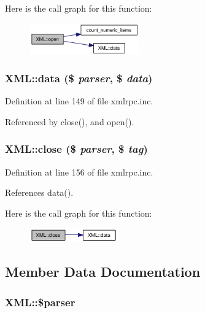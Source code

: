 Here is the call graph for this function:\nopagebreak
\begin{figure}[H]
\begin{center}
\leavevmode
\includegraphics[width=134pt]{classXML_eac7eae74d866d4f5a0cdb9be27ff279_cgraph}
\end{center}
\end{figure}
\hypertarget{classXML_ca70dfbd3e8ce956075181701b09b033}{
\subsubsection{\setlength{\rightskip}{0pt plus 5cm}XML::data (\$ {\em parser}, \$ {\em data})}}
\label{classXML_ca70dfbd3e8ce956075181701b09b033}




Definition at line 149 of file xmlrpc.inc.

Referenced by close(), and open().\hypertarget{classXML_60144a2134fc1b7f5b4b1b6a7c56bf04}{
\subsubsection{\setlength{\rightskip}{0pt plus 5cm}XML::close (\$ {\em parser}, \$ {\em tag})}}
\label{classXML_60144a2134fc1b7f5b4b1b6a7c56bf04}




Definition at line 156 of file xmlrpc.inc.

References data().

Here is the call graph for this function:\nopagebreak
\begin{figure}[H]
\begin{center}
\leavevmode
\includegraphics[width=107pt]{classXML_60144a2134fc1b7f5b4b1b6a7c56bf04_cgraph}
\end{center}
\end{figure}


\subsection{Member Data Documentation}
\hypertarget{classXML_fa14fbca44236b30ab5f3dcfc4b02890}{
\subsubsection{\setlength{\rightskip}{0pt plus 5cm}XML::\$parser}}
\label{classXML_fa14fbca44236b30ab5f3dcfc4b02890}




